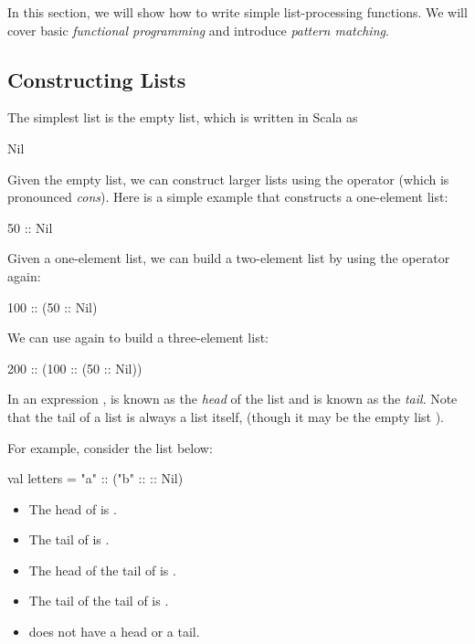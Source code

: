 \documentclass{book}
\begin{document}
In this section, we will show how to write simple list-processing functions. We
will cover basic \emph{functional programming} and introduce \emph{pattern
matching}.

\subsection{Constructing Lists}

The simplest list is the empty list, which is written in Scala as
%
\begin{scalacode}
Nil
\end{scalacode}
%
Given the empty list, we can construct larger lists using the \scalainline{::}
operator (which is pronounced \emph{cons}). Here is a simple example that
constructs a one-element list:
%
\begin{scalacode}
50 :: Nil
\end{scalacode}
Given a one-element list, we can build a two-element list by using the
\scalainline{::} operator again:
%
\begin{scalacode}
100 :: (50 :: Nil)
\end{scalacode}
%
We can use \scalainline{::} again to build a three-element list:
%
\begin{scalacode}
200 :: (100 :: (50 :: Nil))
\end{scalacode}
%
In an expression ,
 is known as the \emph{head} of the list and  is
known as the \emph{tail}. Note that the tail of a list is always a list itself,
(though it may be the empty list ).

For example, consider the list below:
\begin{scalacode}
val letters = "a" :: ("b" :: :: Nil)
\end{scalacode}
%
\begin{itemize}

  \item The head of  is .

  \item The tail of  is .

  \item The head of the tail of  is .

  \item The tail of the tail of  is .

  \item {} does not have a head or a tail.

\end{itemize}
\end{document}
